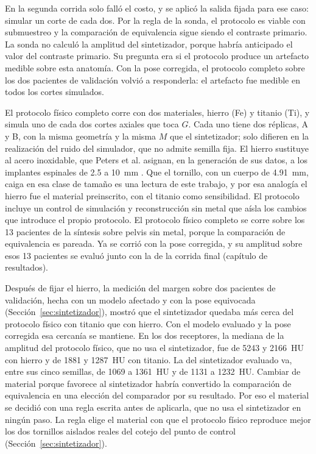 En la segunda corrida solo falló el costo, y se aplicó la salida fijada para ese caso: simular un corte de cada dos. Por la regla de la sonda, el protocolo es viable con submuestreo y la comparación de equivalencia sigue siendo el contraste primario. La sonda no calculó la amplitud del sintetizador, porque habría anticipado el valor del contraste primario. Su pregunta era si el protocolo produce un artefacto medible sobre esta anatomía. Con la pose corregida, el protocolo completo sobre los dos pacientes de validación volvió a responderla: el artefacto fue medible en todos los cortes simulados.

El protocolo físico completo corre con dos materiales, hierro (Fe) y titanio (Ti), y simula uno de cada dos cortes axiales que toca $G$. Cada uno tiene dos réplicas, A y B, con la misma geometría y la misma $M$ que el sintetizador; solo difieren en la realización del ruido del simulador, que no admite semilla fija. El hierro sustituye al acero inoxidable, que Peters et al. asignan, en la generación de sus datos, a los implantes espinales de 2.5 a 10~mm \cite{peters2025hybrid}. Que el tornillo, con un cuerpo de 4.91~mm, caiga en esa clase de tamaño es una lectura de este trabajo, y por esa analogía el hierro fue el material preinscrito, con el titanio como sensibilidad. El protocolo incluye un control de simulación y reconstrucción sin metal que aísla los cambios que introduce el propio protocolo. El protocolo físico completo se corre sobre los 13 pacientes de la síntesis sobre pelvis sin metal, porque la comparación de equivalencia es pareada. Ya se corrió con la pose corregida, y su amplitud sobre esos 13 pacientes se evaluó junto con la de la corrida final (capítulo de resultados).

Después de fijar el hierro, la medición del margen sobre dos pacientes de validación, hecha con un modelo afectado y con la pose equivocada (Sección~\ref{sec:sintetizador}), mostró que el sintetizador quedaba más cerca del protocolo físico con titanio que con hierro. Con el modelo evaluado y la pose corregida esa cercanía se mantiene. En los dos receptores, la mediana de la amplitud del protocolo físico, que no usa el sintetizador, fue de 5243 y 2166~HU con hierro y de 1881 y 1287~HU con titanio. La del sintetizador evaluado va, entre sus cinco semillas, de 1069 a 1361~HU y de 1131 a 1232~HU. Cambiar de material porque favorece al sintetizador habría convertido la comparación de equivalencia en una elección del comparador por su resultado. Por eso el material se decidió con una regla escrita antes de aplicarla, que no usa el sintetizador en ningún paso. La regla elige el material con que el protocolo físico reproduce mejor los dos tornillos aislados reales del cotejo del punto de control (Sección~\ref{sec:sintetizador}).

